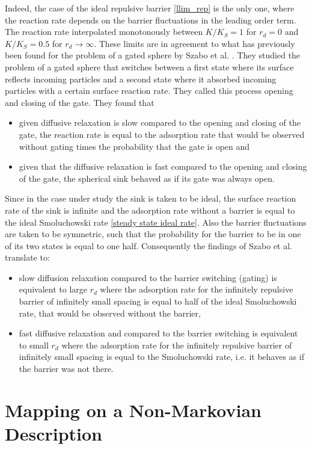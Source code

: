 Indeed, the case of the ideal repulsive barrier \eqref{llim_rep} is the only one, where the reaction rate depends on the barrier fluctuations in the leading order term. The reaction rate interpolated monotonously between $K/K_S = 1$ for $r_d = 0$ and $K/K_S = 0.5$ for $r_d \rightarrow \infty$. These limits are in agreement to what has previously been found for the problem of a gated sphere by Szabo et al. \cite{Szabo1982}. 
They studied the problem of a gated sphere that switches between a first state where its surface reflects incoming particles and a second state where it absorbed incoming particles with a certain surface reaction rate. They called this process opening and closing of the gate.
They found that 
\begin{itemize}
    \item given diffusive relaxation is slow compared to the opening and closing of the gate, the reaction rate is equal to the adsorption rate that would be observed without gating times the probability that the gate is open and
    \item given that the diffusive relaxation is fast compared to the opening and closing of the gate, the spherical sink behaved as if its gate was always open.
\end{itemize}
Since in the case under study the sink is taken to be ideal, the surface reaction rate of the sink is infinite and the adsorption rate without a barrier is equal to the ideal Smoluchowski rate \eqref{steady state ideal rate}. Also the barrier fluctuations are taken to be symmetric, such that the probability for the barrier to be in one of its two states is equal to one half.
Consequently the findings of Szabo et al. translate to:
\begin{itemize}
    \item slow diffusion relaxation compared to the barrier switching (gating) is equivalent to large $r_d$ where the adsorption rate for the infinitely repulsive barrier of infinitely small spacing is equal to half of the ideal Smoluchowski rate, that would be observed without the barrier,
    \item fast diffusive relaxation and compared to the barrier switching is equivalent to small $r_d$ where the adsorption rate for the infinitely repulsive barrier of infinitely small spacing is equal to the Smoluchowski rate, i.e. it behaves as if the barrier was not there.
\end{itemize}

\newpage
\section{Mapping on a Non-Markovian Description}
\label{mapping}
